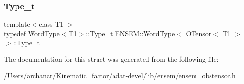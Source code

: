 \subsubsection{\texorpdfstring{Type\_t}{Type\_t}\hspace{0.1cm}{\footnotesize\ttfamily [3/3]}}
{\footnotesize\ttfamily template$<$class T1 $>$ \\
typedef \mbox{\hyperlink{structENSEM_1_1WordType}{Word\+Type}}$<$T1$>$\+::\mbox{\hyperlink{structENSEM_1_1WordType_3_01OTensor_3_01T1_01_4_01_4_a7eb2940d941e35ae189a26d059d7668b}{Type\+\_\+t}} \mbox{\hyperlink{structENSEM_1_1WordType}{E\+N\+S\+E\+M\+::\+Word\+Type}}$<$ \mbox{\hyperlink{classENSEM_1_1OTensor}{O\+Tensor}}$<$ T1 $>$ $>$\+::\mbox{\hyperlink{structENSEM_1_1WordType_3_01OTensor_3_01T1_01_4_01_4_a7eb2940d941e35ae189a26d059d7668b}{Type\+\_\+t}}}



The documentation for this struct was generated from the following file\+:\begin{DoxyCompactItemize}
\item 
/\+Users/archanar/\+Kinematic\+\_\+factor/adat-\/devel/lib/ensem/\mbox{\hyperlink{adat-devel_2lib_2ensem_2ensem__obstensor_8h}{ensem\+\_\+obstensor.\+h}}\end{DoxyCompactItemize}
